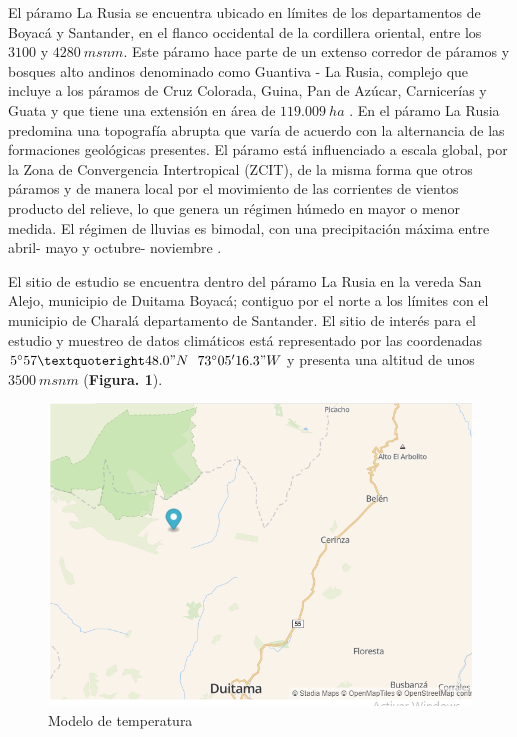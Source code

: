 \documentclass[conference,final,]{IEEEtran}
\makeatletter
\def\maxwidth{\ifdim\Gin@nat@width>\linewidth\linewidth
\else\Gin@nat@width\fi}
\let\Oldincludegraphics\includegraphics
\renewcommand{\includegraphics}[1]{\Oldincludegraphics[width=\maxwidth]{#1}}
\makeatother
\begin{document}
El páramo La Rusia se encuentra ubicado en límites de los departamentos
de Boyacá y Santander, en el flanco occidental de la cordillera
oriental, entre los \(3100\) y \(4280 \ msnm\). Este páramo hace parte
de un extenso corredor de páramos y bosques alto andinos denominado como
Guantiva - La Rusia, complejo que incluye a los páramos de Cruz
Colorada, Guina, Pan de Azúcar, Carnicerías y Guata y que tiene una
extensión en área de \(119.009 \ ha\) \citep{Cobo}. En el
páramo La Rusia predomina una topografía abrupta que varía de acuerdo
con la alternancia de las formaciones geológicas presentes. El páramo
está influenciado a escala global, por la Zona de Convergencia
Intertropical (ZCIT), de la misma forma que otros páramos y de manera
local por el movimiento de las corrientes de vientos producto del
relieve, lo que genera un régimen húmedo en mayor o menor medida. El
régimen de lluvias es bimodal, con una precipitación máxima entre abril-
mayo y octubre- noviembre \citep{Uptc}.

El sitio de estudio se encuentra dentro del páramo La Rusia en la vereda
San Alejo, municipio de Duitama Boyacá; contiguo por el norte a los
límites con el municipio de Charalá departamento de Santander. El sitio
de interés para el estudio y muestreo de datos climáticos está
representado por las coordenadas \(5^{\circ}57’48.0"N\)
\(73^{\circ}05'16.3"W\) y presenta una altitud de unos \(3500\ msnm\) (\textbf{Figura. 1}).

\begin{figure}
\centering
\includegraphics{mapaloc.png}
\caption{Modelo de temperatura}
\end{figure}
\end{document}
